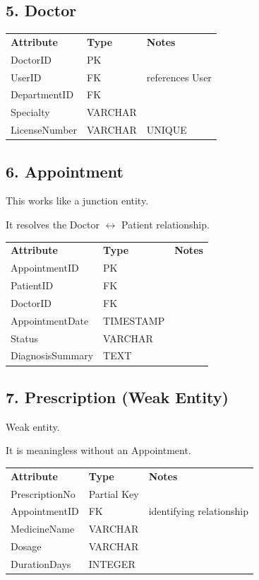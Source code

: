 \subsection*{5. Doctor}
\begin{tabular}{lll}
\textbf{Attribute} & \textbf{Type} & \textbf{Notes} \\
DoctorID & PK &  \\
UserID & FK & references User \\
DepartmentID & FK &  \\
Specialty & VARCHAR &  \\
LicenseNumber & VARCHAR & UNIQUE \\
\end{tabular}

\subsection*{6. Appointment}

This works like a junction entity.

It resolves the Doctor $\leftrightarrow$ Patient relationship.

\begin{tabular}{lll}
\textbf{Attribute} & \textbf{Type} & \textbf{Notes} \\
AppointmentID & PK &  \\
PatientID & FK &  \\
DoctorID & FK &  \\
AppointmentDate & TIMESTAMP &  \\
Status & VARCHAR &  \\
DiagnosisSummary & TEXT &  \\
\end{tabular}

\subsection*{7. Prescription (Weak Entity)}

Weak entity.

It is meaningless without an Appointment.

\begin{tabular}{lll}
\textbf{Attribute} & \textbf{Type} & \textbf{Notes} \\
PrescriptionNo & Partial Key &  \\
AppointmentID & FK & identifying relationship \\
MedicineName & VARCHAR &  \\
Dosage & VARCHAR &  \\
DurationDays & INTEGER &  \\
\end{tabular}

